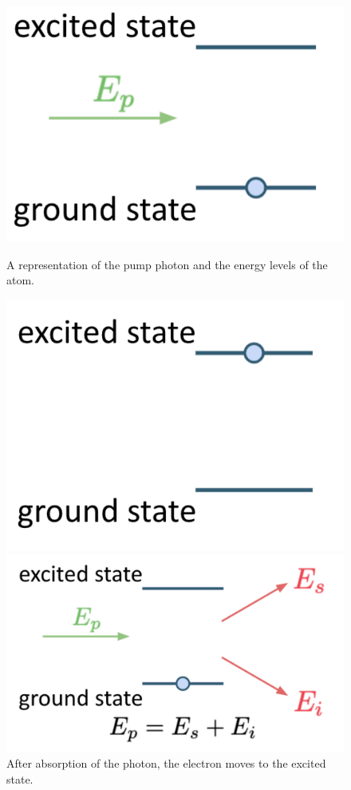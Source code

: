 \begin{figure}[H]
  \centering
  \begin{minipage}[b]{0.3\textwidth}
    \includegraphics[width=\textwidth]{lesson4/state1.pdf}
    \caption{A representation of the pump photon and the energy levels of the atom.}
  \end{minipage}
  \hfill
  \begin{minipage}[b]{0.3\textwidth}
    \includegraphics[width=\textwidth]{lesson4/state2.pdf}
    \caption{After absorption of the photon, the electron moves to the excited state.}
  \end{minipage}
  \hfill
  \begin{minipage}[b]{0.3\textwidth}
    \includegraphics[width=\textwidth]{lesson4/state3.pdf}

\end{minipage}
\end{figure}
